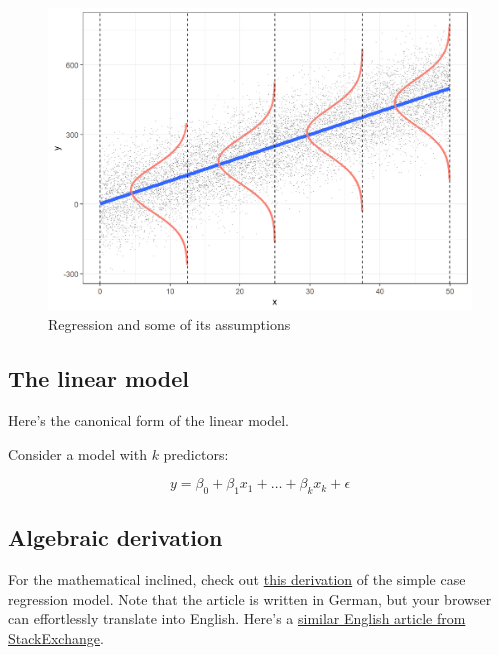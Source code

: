 \documentclass[
  letterpaper,
  DIV=11,
  numbers=noendperiod]{scrreprt}
\theoremstyle{definition}
\theoremstyle{definition}
\theoremstyle{remark}
\begin{document}
\begin{figure}

{\centering \includegraphics{./img/OLSassumptions-1.png}

}

\caption{\label{fig-regr2}Regression and some of its assumptions}

\end{figure}

\hypertarget{the-linear-model}{%
\subsection{The linear model}\label{the-linear-model}}

Here's the canonical form of the linear model.

Consider a model with \(k\) predictors:

\[y = \beta_0 + \beta_1 x_1 + \ldots + \beta_k x_k + \epsilon\]

\hypertarget{algebraic-derivation}{%
\subsection{Algebraic derivation}\label{algebraic-derivation}}

For the mathematical inclined, check out
\href{https://data-se.netlify.app/2022/05/23/ableitung-der-koeffizienten-der-einfachen-regression/}{this
derivation} of the simple case regression model. Note that the article
is written in German, but your browser can effortlessly translate into
English. Here's a
\href{https://math.stackexchange.com/questions/716826/derivation-of-simple-linear-regression-parameters}{similar
English article from StackExchange}.
\end{document}
